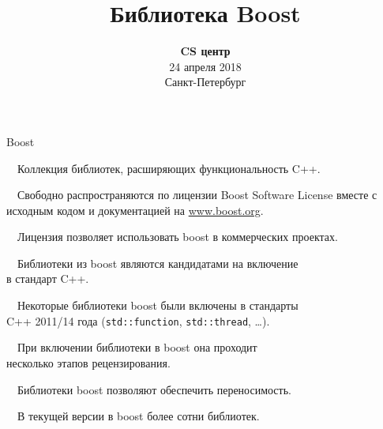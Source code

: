 \documentclass{beamer}
\title{Библиотека Boost}
\date{
   \textbf{CS центр}\\
   24 апреля 2018 \\
   Санкт-Петербург
}
\newcommand{\fakeitem}{\par{\color{MOOCBlue}\textbullet}\ \ }
\begin{document}
\begin{frame} 
  \titlepage
\end{frame}

\begin{frame}[fragile]{Boost}
    
        \fakeitem Коллекция библиотек, расширяющих функциональность C++.

        \fakeitem Свободно распространяются по лицензии Boost Software License вместе с исходным кодом и документацией на 
        \url{www.boost.org}. 
        
        \fakeitem Лицензия позволяет использовать boost в коммерческих проектах.

        \fakeitem Библиотеки из boost являются кандидатами
            на включение\\ в стандарт C++.

        \fakeitem Некоторые библиотеки boost были включены в стандарты\\ C++ 2011/14 года (\texttt{std::function}, \texttt{std::thread}, \ldots).

        \fakeitem При включении библиотеки в boost она проходит\\ несколько этапов
            рецензирования.
            
        \fakeitem Библиотеки boost позволяют обеспечить переносимость.

        \fakeitem В текущей версии в boost более сотни библиотек.
\end{frame}
\end{document}
